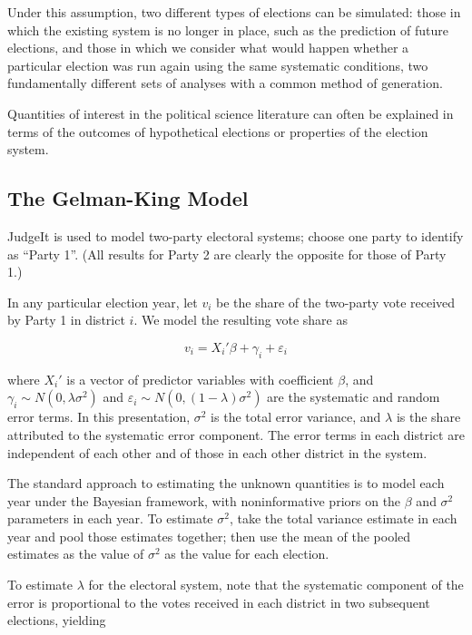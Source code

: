 \documentclass[oneside,letterpaper,titlepage]{article}
\begin{document}
Under this assumption, two different types of elections can be simulated: those in which the existing system is no longer in place, such as the prediction of future elections, and those in which we consider what would happen whether a particular election was run again using the same systematic conditions, two fundamentally different sets of analyses with a common method of generation.

Quantities of interest in the political science literature can often be explained in terms of the outcomes of hypothetical elections or properties of the election system. 

\subsection*{The Gelman-King Model}

JudgeIt is used to model two-party electoral systems; choose one party to identify as ``Party 1''. (All results for Party 2 are clearly the opposite for those of Party 1.) 

In any particular election year, let $v_i$ be the share of the two-party vote received by Party 1 in district $i$. We model the resulting vote share as

\[ v_i = X_i'\beta + \gamma_i + \varepsilon_i \]

\noindent where $X_i'$ is a vector of predictor variables with coefficient $\beta$, and $\gamma_i \sim N(0,\lambda \sigma^2)$ and $\varepsilon_i \sim N(0,(1-\lambda) \sigma^2)$ are the systematic and random error terms. In this presentation, $\sigma^2$ is the total error variance, and $\lambda$ is the share attributed to the systematic error component. The error terms in each district are independent of each other and of those in each other district in the system.


The standard approach to estimating the unknown quantities is to model each year under the Bayesian framework, with noninformative priors on the $\beta$ and $\sigma^2$ parameters in each year. To estimate $\sigma^2$, take the total variance estimate in each year and pool those estimates together; then use the mean of the pooled estimates as the value of $\sigma^2$ as the value for each election. 

To estimate $\lambda$ for the electoral system, note that the systematic component of the error is proportional to the votes received in each district in two subsequent elections, yielding 
\end{document}

